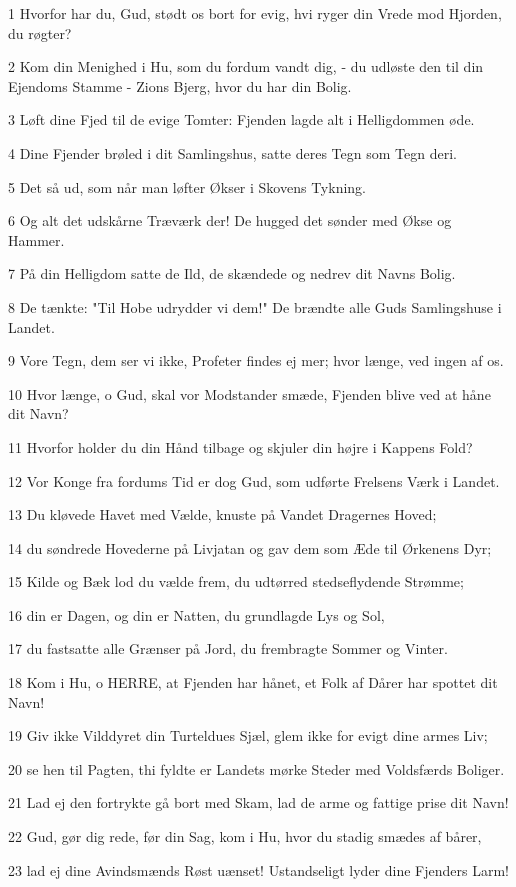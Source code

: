 \par 1 Hvorfor har du, Gud, stødt os bort for evig, hvi ryger din Vrede mod Hjorden, du røgter?
\par 2 Kom din Menighed i Hu, som du fordum vandt dig, - du udløste den til din Ejendoms Stamme - Zions Bjerg, hvor du har din Bolig.
\par 3 Løft dine Fjed til de evige Tomter: Fjenden lagde alt i Helligdommen øde.
\par 4 Dine Fjender brøled i dit Samlingshus, satte deres Tegn som Tegn deri.
\par 5 Det så ud, som når man løfter Økser i Skovens Tykning.
\par 6 Og alt det udskårne Træværk der! De hugged det sønder med Økse og Hammer.
\par 7 På din Helligdom satte de Ild, de skændede og nedrev dit Navns Bolig.
\par 8 De tænkte: "Til Hobe udrydder vi dem!" De brændte alle Guds Samlingshuse i Landet.
\par 9 Vore Tegn, dem ser vi ikke, Profeter findes ej mer; hvor længe, ved ingen af os.
\par 10 Hvor længe, o Gud, skal vor Modstander smæde, Fjenden blive ved at håne dit Navn?
\par 11 Hvorfor holder du din Hånd tilbage og skjuler din højre i Kappens Fold?
\par 12 Vor Konge fra fordums Tid er dog Gud, som udførte Frelsens Værk i Landet.
\par 13 Du kløvede Havet med Vælde, knuste på Vandet Dragernes Hoved;
\par 14 du søndrede Hovederne på Livjatan og gav dem som Æde til Ørkenens Dyr;
\par 15 Kilde og Bæk lod du vælde frem, du udtørred stedseflydende Strømme;
\par 16 din er Dagen, og din er Natten, du grundlagde Lys og Sol,
\par 17 du fastsatte alle Grænser på Jord, du frembragte Sommer og Vinter.
\par 18 Kom i Hu, o HERRE, at Fjenden har hånet, et Folk af Dårer har spottet dit Navn!
\par 19 Giv ikke Vilddyret din Turteldues Sjæl, glem ikke for evigt dine armes Liv;
\par 20 se hen til Pagten, thi fyldte er Landets mørke Steder med Voldsfærds Boliger.
\par 21 Lad ej den fortrykte gå bort med Skam, lad de arme og fattige prise dit Navn!
\par 22 Gud, gør dig rede, før din Sag, kom i Hu, hvor du stadig smædes af bårer,
\par 23 lad ej dine Avindsmænds Røst uænset! Ustandseligt lyder dine Fjenders Larm!

